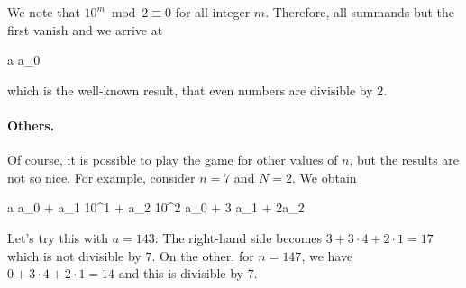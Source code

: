 We note that $10^m \bmod 2 \equiv 0$ for all integer $m$. Therefore, all summands but the first vanish and we arrive at

\bee
a  \equiv a_0 
\eee

which is the well-known result, that even numbers are divisible by $2$.

\paragraph{Others.} Of course, it is possible to play the game for other values of $n$, but the results are not so nice. For example, consider $n=7$ and $N=2$. We obtain

\bee
a  \equiv a_0  + a_1  10^1  + a_2  10^2  \equiv a_0  + 3 a_1  + 2a_2 
\eee

Let's try this with $a=143$: The right-hand side becomes $3 + 3 \cdot 4 + 2 \cdot 1 = 17$ which is not divisible by $7$. On the other, for $n=147$, we have $0 + 3 \cdot 4 + 2 \cdot 1 = 14$ and this is divisible by $7$.


